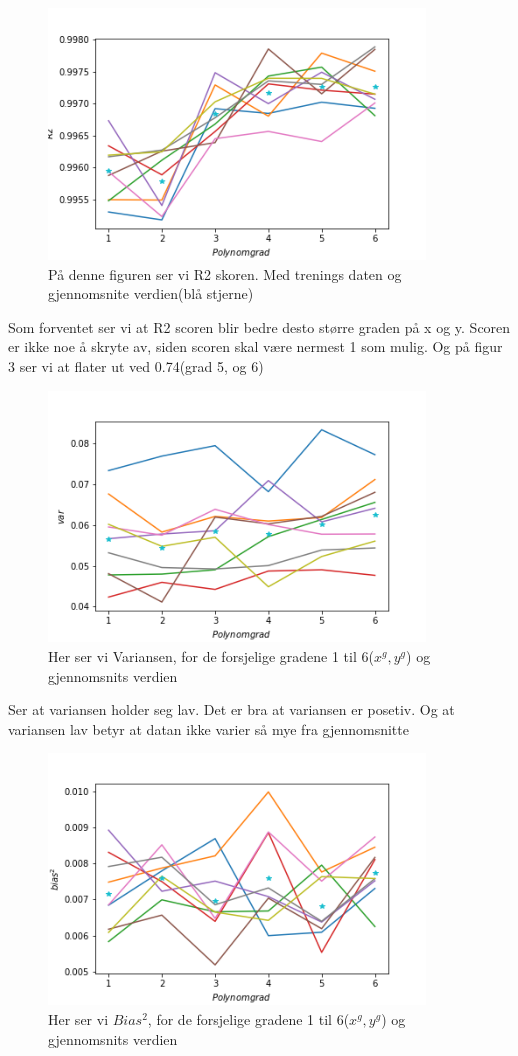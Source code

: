 \documentclass[norsk,a4paper,12pt]{article}
\begin{document}
\begin{figure}[H]
\includegraphics[width=100mm]{R2}
\caption{På denne figuren ser vi R2 skoren. Med trenings daten og gjennomsnite verdien(blå stjerne) }
\end{figure}
Som forventet ser vi at R2 scoren blir bedre desto større graden på x og y. Scoren er ikke noe å skryte av, siden scoren skal være nermest 1 som mulig. Og på figur 3 ser vi at flater ut ved 0.74(grad 5, og 6)



\begin{figure}[H]
\includegraphics[width=100mm]{var}
\caption{Her ser vi Variansen, for de forsjelige gradene 1 til 6($x^g,y^g$) og gjennomsnits verdien  }
\end{figure}

Ser at variansen holder seg lav. Det er bra at variansen er posetiv. Og at variansen lav betyr at datan ikke varier så mye fra gjennomsnitte 

\begin{figure}[H]
\includegraphics[width=100mm]{Bias}
\caption{ Her ser vi $Bias^2$, for de forsjelige gradene 1 til 6($x^g,y^g$) og gjennomsnits verdien }
\end{figure}
\end{document}
